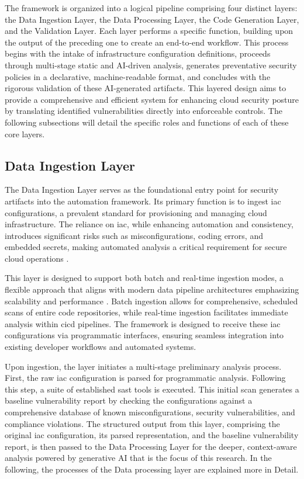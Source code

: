 The framework is organized into a logical pipeline comprising four distinct layers: the Data Ingestion Layer, the Data Processing Layer, the Code Generation Layer, and the Validation Layer. Each layer performs a specific function, building upon the output of the preceding one to create an end-to-end workflow. This process begins with the intake of infrastructure configuration definitions, proceeds through multi-stage static and AI-driven analysis, generates preventative security policies in a declarative, machine-readable format, and concludes with the rigorous validation of these AI-generated artifacts. This layered design aims to provide a comprehensive and efficient system for enhancing cloud security posture by translating identified vulnerabilities directly into enforceable controls. The following subsections will detail the specific roles and functions of each of these core layers.

\subsection{Data Ingestion Layer} %
\label{sec:data-ingestion-layer}

The Data Ingestion Layer serves as the foundational entry point for security artifacts into the automation framework. Its primary function is to ingest \gls{iac} configurations, a prevalent standard for provisioning and managing cloud infrastructure. The reliance on \gls{iac}, while enhancing automation and consistency, introduces significant risks such as misconfigurations, coding errors, and embedded secrets, making automated analysis a critical requirement for secure cloud operations \cite{hayagreevan_security_2024}.

This layer is designed to support both batch and real-time ingestion modes, a flexible approach that aligns with modern data pipeline architectures emphasizing scalability and performance \cite{ismail_big_2025}. Batch ingestion allows for comprehensive, scheduled scans of entire code repositories, while real-time ingestion facilitates immediate analysis within \gls{cicd} pipelines. The framework is designed to receive these \gls{iac} configurations via programmatic interfaces, ensuring seamless integration into existing developer workflows and automated systems.

Upon ingestion, the layer initiates a multi-stage preliminary analysis process. First, the raw \gls{iac} configuration is parsed for programmatic analysis. Following this step, a suite of established \gls{sast} tools is executed. This initial scan generates a baseline vulnerability report by checking the configurations against a comprehensive database of known misconfigurations, security vulnerabilities, and compliance violations. The structured output from this layer, comprising the original \gls{iac} configuration, its parsed representation, and the baseline vulnerability report, is then passed to the Data Processing Layer for the deeper, context-aware analysis powered by generative AI that is the focus of this research. In the following, the processes of the Data processing layer are explained more in Detail.

